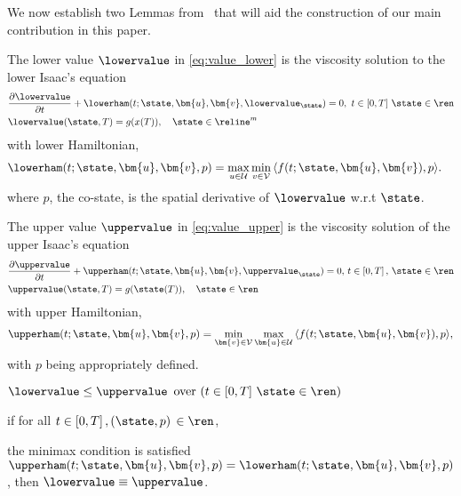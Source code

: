 \noindent  We now establish two Lemmas from~\cite{Souganidis} that will aid the construction of our main contribution in this paper. 
%
\begin{lemma}
	The lower value $\lowervalue$ in \eqref{eq:value_lower} is the viscosity solution to the lower Isaac's equation 
	\begin{subequations}
		\begin{align}
			&\frac{\partial \lowervalue}{\partial t} + \lowerham (t; \state, \bm{u}, \bm{v}, \lowervalue_{\state}) = 0, \,\, t\in \left[0, T\right]\, \state \in \ren  \\
			&\lowervalue(\state, T) = g(x(T)), \quad \state \in \reline^m
			\label{eq:lower_visc_boundary}
		\end{align}
		\label{eq:lower_visc}
	\end{subequations}
	with lower Hamiltonian, 
	\begin{align}
		&\lowerham (t; \state, \bm{u}, \bm{v}, p) = \max_{u \in \mathcal{U}} \min_{v \in \mathcal{V}} \, \langle f(t; \state, \bm{u}, \bm{v}), p  \rangle.
		\label{eq:lower_visc_ham}
	\end{align}
%
where $p$, the co-state, is the spatial derivative of $\lowervalue$ w.r.t $\state$.
	\label{lemma:lower_visc_lemma}
\end{lemma}
%
\begin{lemma}
	The upper value $\uppervalue$ in \eqref{eq:value_upper} is the viscosity solution of the upper Isaac's equation 
	\begin{subequations}
		\begin{align}
			&\frac{\partial \uppervalue}{\partial t} + \upperham (t; \state, \bm{u}, \bm{v},  \uppervalue_{\state})= 0, \, t\in \left[0,T\right],\, \state \in \ren
			 \\
			&\uppervalue(\state, T) = g(\state(T)), \quad \state \in \ren
		\end{align}
		\label{eq:upper_visc}
	\end{subequations}
	with upper Hamiltonian, 
	\begin{align}
		\upperham (t; \state, \bm{u}, \bm{v}, p) = \min_{\bm{v} \in \mathcal{V}} \max_{\bm{u} \in \mathcal{U}} \, \langle f(t; \state, \bm{u}, \bm{v}), p \rangle,
	\end{align}
	with $p$ being appropriately defined.
	\label{lemma:upper_visc_lemma}
\end{lemma}
%
\begin{corollary}
	\begin{inparaenum}[(i)]
		\item  $\lowervalue \le \uppervalue \, \text{ over } (t\in \left[0,T\right]\, \state \in \ren)$
		\item if for all $t\in \left[0,T\right], (\state, p) \, \in \ren$,
	\end{inparaenum} 
	the minimax condition is satisfied \ie 	$\upperham(t; \state, \bm{u}, \bm{v}, p) = \lowerham(t; \state, \bm{u}, \bm{v}, p)$, then
	$\lowervalue \equiv \uppervalue$.
\end{corollary}
%


